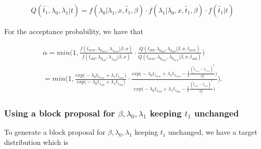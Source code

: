 \begin{align}
    Q(\widetilde{t_1}, \lambda_0, \lambda_1 |t) = f(\lambda_0| \lambda_1, x, \widetilde{t_1}, \beta)\cdot f(\lambda_1| \lambda_0, x, \widetilde{t_1}, \beta)\cdot f(\widetilde{t_1}| t) \nonumber %
\end{align}

For the acceptance probability, we have that

\begin{align}
    \alpha = min \Bigg(1,  \frac{
    f(t_{new}, \lambda_{0_{new}}, \lambda_{1_{new}}|\beta, x)}{f(t_{old}, \lambda_{0_{old}}, \lambda_{1_{old}}|\beta, x)}
    \cdot 
    \frac{Q(t_{old}, \lambda_{0_{old}}, \lambda_{0_{old}} | \beta, x, t_{new})}{Q(t_{new}, \lambda_{0_{new}}, \lambda_{0_{new}} | \beta, x, t_{old})} \Bigg) \\
    = min \Bigg(1, \frac{ exp \Big( -\lambda_0t_{1_{new}} +\lambda_1t_{1_{new}}  \Big)}{ exp \Big( -\lambda_0t_{1_{old}} +\lambda_1t_{1_{old}} \Big)} 
    \cdot \frac{ exp \Big(  -\lambda_0 t_{1_{new}} + \lambda_1 t_{1_{new}}   -\frac{1}{2} \frac{(\widetilde{t}_{1_{new}}-t_{1_{new}})^2}{\sigma_t^2} \Big)}{ exp \Big(  -\lambda_0 t_{1_{old}}  + \lambda_1 t_{1_{old}}  -\frac{1}{2} \frac{(\widetilde{t}_{1_{old}}-t_{1_{old}})^2}{\sigma_t^2} \Big)}   \Bigg).
\end{align}




\subsubsection{Using a block proposal for $\beta, \lambda_0, \lambda_1$ keeping $t_1$ unchanged}

To generate a block proposal for $\beta, \lambda_0, \lambda_1$ keeping $t_1$ unchanged, we have a target distribution which is 


